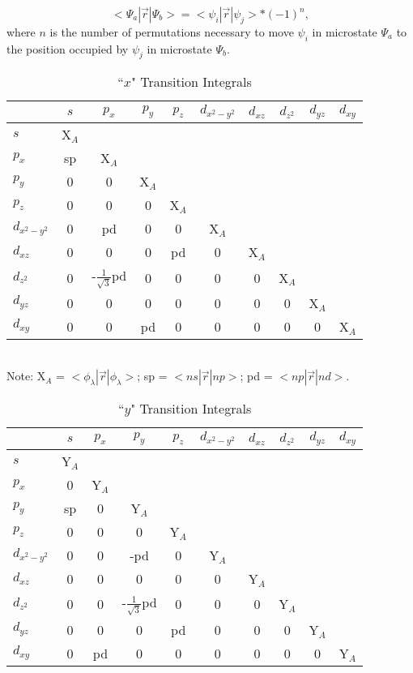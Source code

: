 $$
<\! \Psi_a|\vec{r}|\Psi_b\! > =<\! \psi_i|\vec{r}|\psi_j\! >*(-1)^n,
$$
where $n$ is the number of permutations necessary to move $\psi_i$ in microstate $\Psi_a$ to the position
occupied by $\psi_j$ in microstate $\Psi_b$.
\begin{table}
\caption{\label{transx} ``$x$" Transition Integrals}
\begin{center}
\begin{tabular}{l|ccccccccc} \hline
& $s$  &  $p_x$  &  $p_y$  &  $p_z$  &  $d_{x^2-y^2}$  & $d_{xz}$  &
$d_{z^2}$  &  $d_{yz}$  &  $d_{xy}$ \\ \hline
$s$ & X$_A$\\
$p_x$ & sp & X$_A$\\
$p_y$  & 0 & 0 & X$_A$ \\
$p_z$  & 0 & 0 & 0 & X$_A$\\
$d_{x^2-y^2}$ & 0 & pd & 0 & 0 & X$_A$\\
$d_{xz}$      & 0 & 0 & 0 & pd & 0 & X$_A$\\
$d_{z^2}$     & 0 & -$\frac{1}{\sqrt{3}}$pd & 0 & 0 & 0 & 0 & X$_A$\\
$d_{yz}$      & 0 & 0 & 0 & 0 & 0 & 0 & 0 & X$_A$\\
$d_{xy}$      & 0 & 0 & pd & 0 & 0 & 0 & 0 & 0 & X$_A$\\  \hline


\end{tabular}\\
Note: X$_A$ = $<\! \phi_{\lambda}|\vec{r}|\phi_{\lambda}\! >$; sp = $<\! ns|\vec{r}|np\! >$; pd = $<\! np|\vec{r}|nd\! >$.
\end{center}
\end{table}

\begin{table}
\caption{\label{transy} ``$y$" Transition Integrals}
\begin{center}
\begin{tabular}{l|ccccccccc} \hline
& $s$  &  $p_x$  &  $p_y$  &  $p_z$  &  $d_{x^2-y^2}$  & $d_{xz}$  &
$d_{z^2}$  &  $d_{yz}$  &  $d_{xy}$ \\ \hline
$s$ & Y$_A$\\
$p_x$ & 0 & Y$_A$\\
$p_y$  & sp & 0 & Y$_A$ \\
$p_z$  & 0 & 0 & 0 & Y$_A$\\
$d_{x^2-y^2}$ & 0 & 0 & -pd & 0 & Y$_A$\\
$d_{xz}$      & 0 & 0 & 0 & 0 & 0 & Y$_A$\\
$d_{z^2}$     & 0 & 0 & -$\frac{1}{\sqrt{3}}$pd & 0 & 0 & 0 & Y$_A$\\
$d_{yz}$      & 0 & 0 & 0 & pd & 0 & 0 & 0 & Y$_A$\\
$d_{xy}$      & 0 & pd & 0 & 0 & 0 & 0 & 0 & 0 & Y$_A$\\  \hline


\end{tabular}\\
\end{center}
\end{table}

